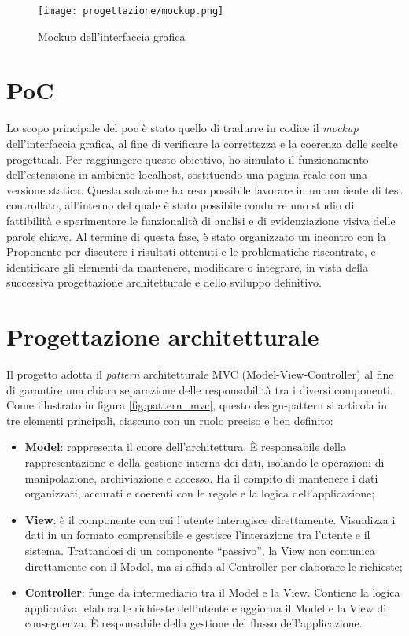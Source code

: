 \begin{figure}[H]
  \centering 
  \texttt{[image: progettazione/mockup.png]} 
  \caption{Mockup dell'interfaccia grafica}
  \label{fig:mockup}
\end{figure}

\section{PoC}
\label{sec:poc}

Lo scopo principale del \gls{poc} è stato quello di tradurre in codice il \textit{mockup} dell’interfaccia grafica, al fine di verificare la correttezza e la coerenza delle scelte progettuali. Per raggiungere questo obiettivo, ho simulato il funzionamento dell’estensione in ambiente \gls{localhost}, sostituendo una pagina reale con una versione statica. Questa soluzione ha reso possibile lavorare in un ambiente di test controllato, all’interno del quale è stato possibile condurre uno studio di fattibilità e sperimentare le funzionalità di analisi e di evidenziazione visiva delle parole chiave. Al termine di questa fase, è stato organizzato un incontro con la Proponente per discutere i risultati ottenuti e le problematiche riscontrate, e identificare gli elementi da mantenere, modificare o integrare, in vista della successiva progettazione architetturale e dello sviluppo definitivo.

\section{Progettazione architetturale}
\label{sec:progettazione}

Il progetto adotta il \textit{pattern} architetturale MVC (Model-View-Controller) al fine di garantire una chiara separazione delle responsabilità tra i diversi componenti. Come illustrato in figura \ref{fig:pattern_mvc}, questo \gls{design-pattern} si articola in tre elementi principali, ciascuno con un ruolo preciso e ben definito:
\begin{itemize}
  \item \textbf{Model}: rappresenta il cuore dell’architettura. È responsabile della rappresentazione e della gestione interna dei dati, isolando le operazioni di manipolazione, archiviazione e accesso. Ha il compito di mantenere i dati organizzati, accurati e coerenti con le regole e la logica dell’applicazione;
  \item \textbf{View}: è il componente con cui l’utente interagisce direttamente. Visualizza i dati in un formato comprensibile e gestisce l’interazione tra l’utente e il sistema. Trattandosi di un componente “passivo”, la View non comunica direttamente con il Model, ma si affida al Controller per elaborare le richieste;
  \item \textbf{Controller}: funge da intermediario tra il Model e la View. Contiene la logica applicativa, elabora le richieste dell’utente e aggiorna il Model e la View di conseguenza. È responsabile della gestione del flusso dell’applicazione.
\end{itemize}

